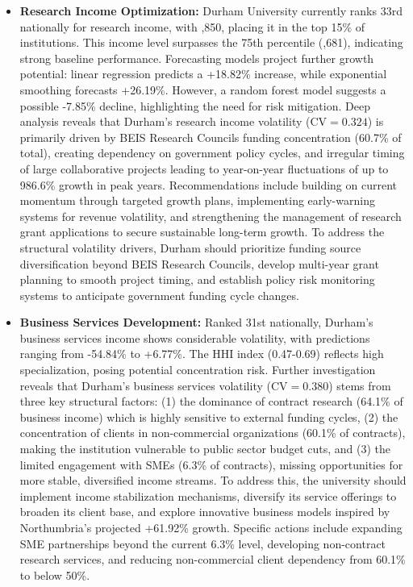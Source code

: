 \documentclass[journal,onecolumn, 10pt,draftclsnofoot]{IEEEtran}
\begin{document}
\begin{itemize}
    \item \textbf{Research Income Optimization:} Durham University currently ranks 33rd nationally for research income, with ,850, placing it in the top 15\% of institutions. This income level surpasses the 75th percentile (,681), indicating strong baseline performance. Forecasting models project further growth potential: linear regression predicts a +18.82\% increase, while exponential smoothing forecasts +26.19\%. However, a random forest model suggests a possible -7.85\% decline, highlighting the need for risk mitigation. Deep analysis reveals that Durham's research income volatility ($\mathrm{CV}=0.324$) is primarily driven by BEIS Research Councils funding concentration (60.7\% of total), creating dependency on government policy cycles, and irregular timing of large collaborative projects leading to year-on-year fluctuations of up to 986.6\% growth in peak years. Recommendations include building on current momentum through targeted growth plans, implementing early-warning systems for revenue volatility, and strengthening the management of research grant applications to secure sustainable long-term growth. To address the structural volatility drivers, Durham should prioritize funding source diversification beyond BEIS Research Councils, develop multi-year grant planning to smooth project timing, and establish policy risk monitoring systems to anticipate government funding cycle changes.
      
    \item \textbf{Business Services Development:} Ranked 31st nationally, Durham's business services income shows considerable volatility, with predictions ranging from -54.84\% to +6.77\%. The HHI index (0.47-0.69) reflects high specialization, posing potential concentration risk. Further investigation reveals that Durham's business services volatility ($\mathrm{CV}=0.380$) stems from three key structural factors: (1) the dominance of contract research (64.1\% of business income) which is highly sensitive to external funding cycles, (2) the concentration of clients in non-commercial organizations (60.1\% of contracts), making the institution vulnerable to public sector budget cuts, and (3) the limited engagement with SMEs (6.3\% of contracts), missing opportunities for more stable, diversified income streams. To address this, the university should implement income stabilization mechanisms, diversify its service offerings to broaden its client base, and explore innovative business models inspired by Northumbria's projected +61.92\% growth. Specific actions include expanding SME partnerships beyond the current 6.3\% level, developing non-contract research services, and reducing non-commercial client dependency from 60.1\% to below 50\%.
    

\end{itemize}
\end{document}
